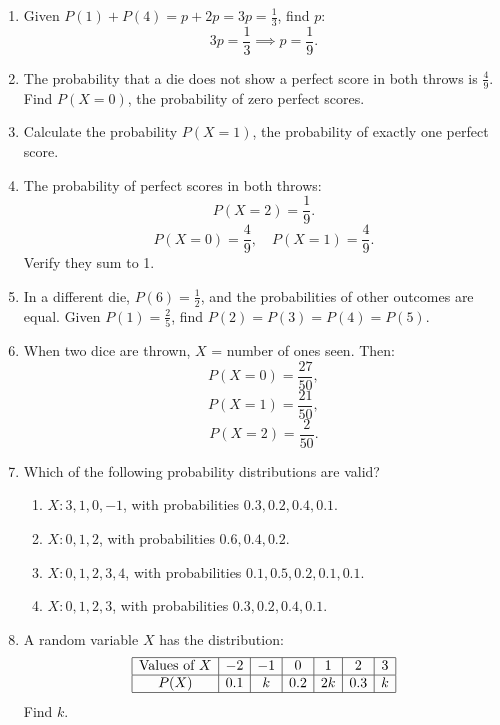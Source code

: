 \documentclass{article}
\begin{document}
\begin{enumerate}
    \item Given \(P(1) + P(4) = p + 2p = 3p = \frac{1}{3}\), find \(p\):
    \[
    3p = \frac{1}{3} \implies p = \frac{1}{9}.
    \]
    
    \item The probability that a die does not show a perfect score in both throws is \(\frac{4}{9}\). Find \(P(X=0)\), the probability of zero perfect scores.
    
    \item Calculate the probability \(P(X=1)\), the probability of exactly one perfect score.
    
    \item The probability of perfect scores in both throws:
    \[
    P(X=2) = \frac{1}{9}.
    \]
    \[
    P(X=0) = \frac{4}{9}, \quad P(X=1) = \frac{4}{9}.
    \]
    Verify they sum to 1.
    
    \item In a different die, \(P(6) = \frac{1}{2}\), and the probabilities of other outcomes are equal. Given \(P(1) = \frac{2}{5}\), find \(P(2) = P(3) = P(4) = P(5)\).
    
    \item When two dice are thrown, \(X\) = number of ones seen. Then:
    \[
    P(X=0) = \frac{27}{50},
    \]
    \[
    P(X=1) = \frac{21}{50},
    \]
    \[
    P(X=2) = \frac{2}{50}.
    \]
    
    \item Which of the following probability distributions are valid?
    \begin{enumerate}
        \item \(X: 3, 1, 0, -1\), with probabilities \(0.3, 0.2, 0.4, 0.1\).
        \item \(X: 0, 1, 2\), with probabilities \(0.6, 0.4, 0.2\).
        \item \(X: 0, 1, 2, 3, 4\), with probabilities \(0.1, 0.5, 0.2, 0.1, 0.1\).
        \item \(X: 0, 1, 2, 3\), with probabilities \(0.3, 0.2, 0.4, 0.1\).
    \end{enumerate}
    
    \item A random variable \(X\) has the distribution:
    \[
    \begin{array}{|c|c|c|c|c|c|c|}
    \hline
    \text{Values of } X & -2 & -1 & 0 & 1 & 2 & 3 \\
    \hline
    P(X) & 0.1 & k & 0.2 & 2k & 0.3 & k \\
    \hline
    \end{array}
    \]
    Find \(k\).
    

\end{enumerate}
\end{document}
